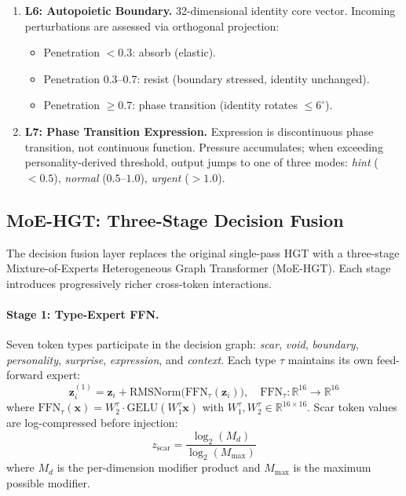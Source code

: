 \documentclass[11pt]{article}
\begin{document}
\begin{enumerate}[leftmargin=*]
\item \textbf{L6: Autopoietic Boundary.} 32-dimensional identity core vector. Incoming perturbations are assessed via orthogonal projection:
\begin{itemize}
\item Penetration $< 0.3$: absorb (elastic).
\item Penetration $0.3$--$0.7$: resist (boundary stressed, identity unchanged).
\item Penetration $\geq 0.7$: phase transition (identity rotates $\leq 6^\circ$).
\end{itemize}

\item \textbf{L7: Phase Transition Expression.} Expression is discontinuous phase transition, not continuous function. Pressure accumulates; when exceeding personality-derived threshold, output jumps to one of three modes: \emph{hint} ($< 0.5$), \emph{normal} ($0.5$--$1.0$), \emph{urgent} ($> 1.0$).
\end{enumerate}

\subsection{MoE-HGT: Three-Stage Decision Fusion}

The decision fusion layer replaces the original single-pass HGT with a three-stage Mixture-of-Experts Heterogeneous Graph Transformer (MoE-HGT). Each stage introduces progressively richer cross-token interactions.

\paragraph{Stage 1: Type-Expert FFN.}
Seven token types participate in the decision graph: \emph{scar}, \emph{void}, \emph{boundary}, \emph{personality}, \emph{surprise}, \emph{expression}, and \emph{context}. Each type $\tau$ maintains its own feed-forward expert:
\begin{equation}
\mathbf{z}_i^{(1)} = \mathbf{z}_i + \text{RMSNorm}\bigl(\text{FFN}_\tau(\mathbf{z}_i)\bigr), \quad \text{FFN}_\tau: \mathbb{R}^{16} \to \mathbb{R}^{16}
\end{equation}
where $\text{FFN}_\tau(\mathbf{x}) = W_2^\tau \cdot \text{GELU}(W_1^\tau \mathbf{x})$ with $W_1^\tau, W_2^\tau \in \mathbb{R}^{16 \times 16}$. Scar token values are log-compressed before injection:
\begin{equation}
z_{\text{scar}} = \frac{\log_2(M_d)}{\log_2(M_{\max})}
\end{equation}
where $M_d$ is the per-dimension modifier product and $M_{\max}$ is the maximum possible modifier.
\end{document}
